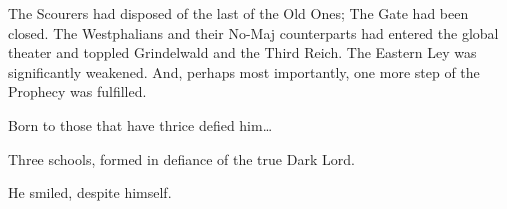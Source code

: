 The Scourers had disposed of the last of the Old Ones; The Gate had been closed. The Westphalians and their No-Maj counterparts had entered the global theater and toppled Grindelwald and the Third Reich. The Eastern Ley was significantly weakened. And, perhaps most importantly, one more step of the Prophecy was fulfilled.

Born to those that have thrice defied him…

Three schools, formed in defiance of the true Dark Lord.

He smiled, despite himself.

